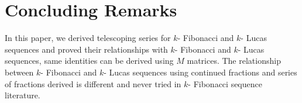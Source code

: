 \section{Concluding Remarks}
In this paper, we derived telescoping series for $k$- Fibonacci and $k$- Lucas sequences and proved their relationships with $k$- Fibonacci and $k$- Lucas sequences, same identities can be derived using $M$ matrices.
 The relationship between $k$- Fibonacci and $k$- Lucas sequences using continued fractions and series of fractions derived is different and never tried in $k$- Fibonacci sequence literature.

